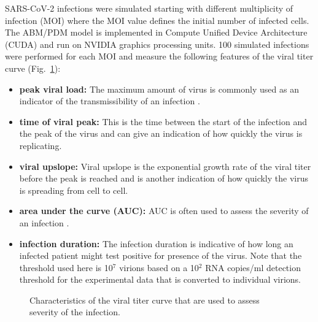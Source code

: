 SARS-CoV-2 infections were simulated starting with different multiplicity of infection (MOI) where the MOI value defines the initial number of infected cells. The ABM/PDM model is implemented in Compute Unified Device Architecture (CUDA) and run on NVIDIA graphics processing units. 100 simulated infections were performed for each MOI and measure the following features of the viral titer curve (Fig.\ \ref{measurements}): 
\begin{itemize}
\item \textbf{peak viral load:} The maximum amount of virus is commonly used as an indicator of the transmissibility of an infection \citep{handel09}. 
\item \textbf{time of viral peak:} This is the time between the start of the infection and the peak of the virus and can give an indication of how quickly the virus is replicating.
\item \textbf{viral upslope:} Viral upslope is the exponential growth rate of the viral titer before the peak is reached and is another indication of how quickly the virus is spreading from cell to cell. 
\item \textbf{area under the curve (AUC):} AUC is often used to assess the severity of an infection \citep{hayden00, barroso05}.
\item \textbf{infection duration:} The infection duration is indicative of how long an infected patient might test positive for presence of the virus. Note that the threshold used here is 10$^7$ virions based on a 10$^2$ RNA copies/ml detection threshold for the experimental data \citep{goncalves20} that is converted to individual virions.
\end{itemize}
\begin{figure}[!h]

\begin{center}
\caption{Characteristics of the viral titer curve that are used to assess severity of the infection.\label{measurements}}
\end{center}
\end{figure} 


